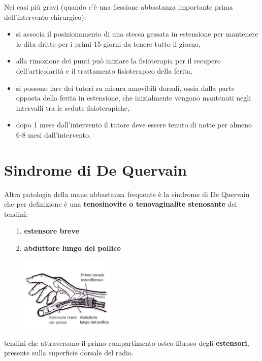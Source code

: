 Nei casi più gravi (quando c'è una flessione abbastanza importante prima dell'intervento chirurgico):

\begin{itemize}
\item
  si associa il posizionamento di una stecca gessata in estensione per  mantenere le dita dritte per i primi 15 giorni da tenere tutto il giorno,
\item
  alla rimozione dei punti può iniziare la fisioterapia per il recupero dell'articolarità e il trattamento fisioterapico della ferita,
\item
  si possono fare dei tutori su misura amovibili dorsali, ossia dalla parte opposta della ferita in estensione, che inizialmente vengono mantenuti negli intervalli tra le sedute fisioterapiche,
\item
  dopo 1 mese dall'intervento il tutore deve essere tenuto di notte per almeno 6-8 mesi dall'intervento.
\end{itemize}


\section{Sindrome di De Quervain}

Altra patologia della mano abbastanza frequente è la sindrome di De Quervain che per definizione è una \textbf{tenosinovite o tenovaginalite stenosante} dei tendini:
\begin{itemize}
\item[1.] \textbf{estensore breve }
\item[2.] \textbf{abduttore lungo del pollice}
\end{itemize}

\begin{figure}[!ht]
\centering
\includegraphics[width=0.4\textwidth]{005/image4.png}
\end{figure}

tendini che attraversano il primo compartimento osteo-fibroso degli \textbf{estensori}, presente sulla superficie dorsale del radio.

